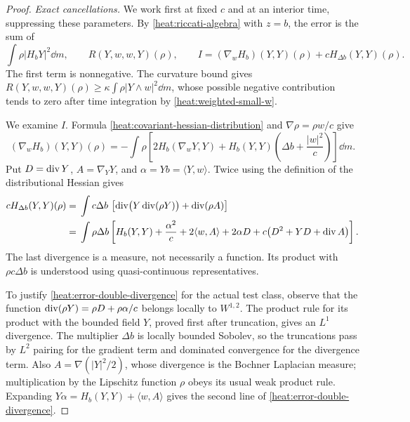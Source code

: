 \begin{proof}
\emph{Exact cancellations.}
We work first at fixed \(c\) and at an interior time, suppressing
these parameters. By \eqref{heat:riccati-algebra} with \(z=b\),
the error is the sum of
\[
\int\rho|H_bY|^2\dd m,\qquad
R(Y,w,w,Y)(\rho),\qquad
I=(\nabla_wH_b)(Y,Y)(\rho)+cH_{\Delta b}(Y,Y)(\rho).
\]
The first term is nonnegative. The curvature bound gives
\(R(Y,w,w,Y)(\rho)\ge
\kappa\int\rho|Y\wedge w|^2\dd m\), whose possible
negative contribution tends to zero after time integration by
\eqref{heat:weighted-small-w}.

We examine \(I\). Formula
\eqref{heat:covariant-hessian-distribution} and
\(\nabla\rho=\rho w/c\) give
\begin{equation}
\label{heat:error-transport}
(\nabla_wH_b)(Y,Y)(\rho)
=-\int\rho\left[
2H_b(\nabla_wY,Y)+H_b(Y,Y)
\left(\Delta b+\frac{|w|^2}{c}\right)\right]\dd m.
\end{equation}
Put \(D=\operatorname{div} Y\), \(A=\nabla_YY\), and
\(\alpha=Yb=\langle Y,w\rangle\). Twice using the
definition of the distributional Hessian gives
\begin{align}
\label{heat:error-double-divergence}
cH_{\Delta b}(Y,Y)(\rho)
={}&\int c\Delta b\,
\left[\operatorname{div}\bigl(Y\operatorname{div}(\rho Y)\bigr)
+\operatorname{div}(\rho A)\right]\notag\\
={}&\int\rho\Delta b
\left[H_b(Y,Y)+\frac{\alpha^2}{c}
+2\langle w,A\rangle+2\alpha D
+c\bigl(D^2+YD+\operatorname{div} A\bigr)\right].
\end{align}
The last divergence is a measure, not necessarily a function.
Its product with \(\rho c\Delta b\) is understood using
quasi-continuous representatives.

To justify \eqref{heat:error-double-divergence} for the actual
test class, observe that the function
\(\operatorname{div}(\rho Y)=\rho D+\rho\alpha/c\) belongs locally to
\(W^{1,2}\). The product rule for its product with the bounded
field \(Y\), proved first after truncation, gives an \(L^1\)
divergence. The multiplier \(\Delta b\) is locally bounded
Sobolev, so the truncations pass by \(L^2\) pairing for the
gradient term and dominated convergence for the divergence
term. Also \(A=\nabla(|Y|^2/2)\), whose divergence is the
Bochner Laplacian measure; multiplication by the Lipschitz
function \(\rho\) obeys its usual weak product rule.
Expanding \(Y\alpha=H_b(Y,Y)+\langle w,A\rangle\) gives
the second line of \eqref{heat:error-double-divergence}.


\end{proof}
